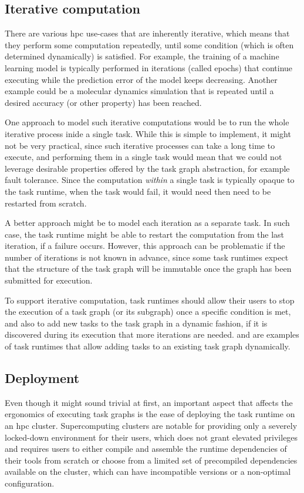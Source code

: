 \subsection{Iterative computation}
There are various \gls{hpc} use-cases that are inherently iterative, which means
that they perform some computation repeatedly, until some condition (which is often determined
dynamically) is satisfied. For example, the training of a machine learning model is typically
performed in iterations (called epochs) that continue executing while the prediction error of the
model keeps decreasing. Another example could be a molecular dynamics simulation that is repeated
until a desired accuracy (or other property) has been reached.

One approach to model such iterative computations would be to run the whole iterative process inide
a single task. While this is simple to implement, it might not be very practical, since such
iterative processes can take a long time to execute, and performing them in a single task would
mean that we could not leverage desirable properties offered by the task graph abstraction, for
example fault tolerance. Since the computation \emph{within} a single task is
typically opaque to the task runtime, when the task would fail, it would need then need to be
restarted from scratch.

A better approach might be to model each iteration as a separate task. In such case, the task
runtime might be able to restart the computation from the last iteration, if a failure occurs.
However, this approach can be problematic if the number of iterations is not known in advance,
since some task runtimes expect that the structure of the task graph will be immutable once the
graph has been submitted for execution.

To support iterative computation, task runtimes should allow their users to stop the execution of a
task graph (or its subgraph) once a specific condition is met, and also to add new tasks to the
task graph in a dynamic fashion, if it is discovered during its execution that more iterations are
needed. \dask{} and \ray{} are examples of task runtimes
that allow adding tasks to an existing task graph dynamically.

\subsection{Deployment}
Even though it might sound trivial at first, an important aspect that affects the ergonomics of
executing task graphs is the ease of deploying the task runtime on an \gls{hpc}
cluster. Supercomputing clusters are notable for providing only a severely locked-down environment
for their users, which does not grant elevated privileges and requires users to either compile and
assemble the runtime dependencies of their tools from scratch or choose from a limited set of
precompiled dependencies available on the cluster, which can have incompatible versions or a
non-optimal configuration.

